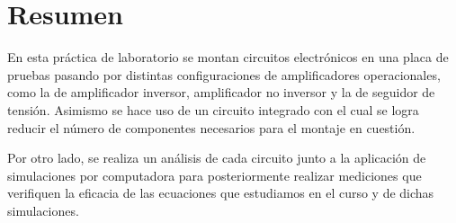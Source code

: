\section{Resumen}

En esta práctica de laboratorio se montan circuitos electrónicos en una placa
de pruebas pasando por distintas configuraciones de amplificadores
operacionales, como la de amplificador inversor, amplificador no inversor
y la de seguidor de tensión. Asimismo se hace uso de un circuito integrado con
el cual se logra reducir el número de componentes necesarios para el montaje
en cuestión.



Por otro lado, se realiza un análisis de cada circuito junto a la
aplicación de simulaciones por computadora para posteriormente realizar
mediciones que verifiquen la eficacia de las ecuaciones que estudiamos
en el curso y de dichas simulaciones.

